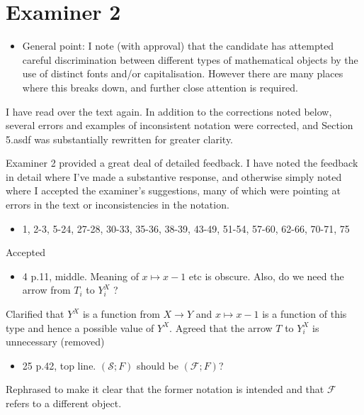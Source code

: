\documentclass[12pt, a4paper]{article}
\begin{document}
\section{Examiner 2}

\begin{itemize}
    \item General point: I note (with approval) that the candidate has attempted careful discrimination between different types of mathematical objects by the use of distinct fonts and/or capitalisation. However there are many places where this breaks down, and further close attention is required.
\end{itemize}

I have read over the text again. In addition to the corrections noted below, several errors and examples of inconsistent notation were corrected, and Section 5.asdf was substantially rewritten for greater clarity.

Examiner 2 provided a great deal of detailed feedback. I have noted the feedback in detail where I've made a substantive response, and otherwise simply noted where I accepted the examiner's suggestions, many of which were pointing at errors in the text or inconsistencies in the notation.

\begin{itemize}
    \item 1, 2-3, 5-24, 27-28, 30-33, 35-36, 38-39, 43-49, 51-54, 57-60, 62-66, 70-71, 75
\end{itemize}

Accepted

\begin{itemize}
    \item 4 p.11, middle. Meaning of $x \mapsto x − 1$ etc is obscure. Also, do we need the arrow from $T_i$ to $Y_i^X$ ?
\end{itemize}

Clarified that $Y^X$ is a function from $X\to Y$ and $x\mapsto x-1$ is a function of this type and hence a possible value of $Y^X$. Agreed that the arrow $T$ to $Y^X_i$ is unnecessary (removed)

\begin{itemize}
    \item 25 p.42, top line. $(\mathcal{S}; F)$ should be $(\mathcal{F}; F)$?
\end{itemize}

Rephrased to make it clear that the former notation is intended and that $\mathcal{F}$ refers to a different object.
\end{document}

